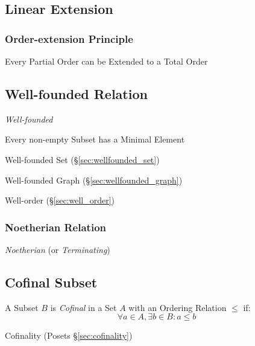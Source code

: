 \subsection{Linear Extension}\label{sec:linear_extension}

\subsubsection{Order-extension Principle}
\label{sec:order_extension_principle}

Every Partial Order can be Extended to a Total Order



\subsection{Well-founded Relation}\label{sec:well_founded}

\emph{Well-founded}

Every non-empty Subset has a Minimal Element

Well-founded Set (\S\ref{sec:wellfounded_set})

Well-founded Graph (\S\ref{sec:wellfounded_graph})

Well-order (\S\ref{sec:well_order})



\subsubsection{Noetherian Relation}\label{sec:noetherian_relation}

\emph{Noetherian} (or \emph{Terminating})



\subsection{Cofinal Subset}\label{sec:cofinal_subset}

A Subset $B$ is \emph{Cofinal} in a Set $A$ with an Ordering Relation
$\leq$ if:
\[
  \forall a \in A, \exists b \in B : a \leq b
\]

Cofinality (Posets \S\ref{sec:cofinality})

